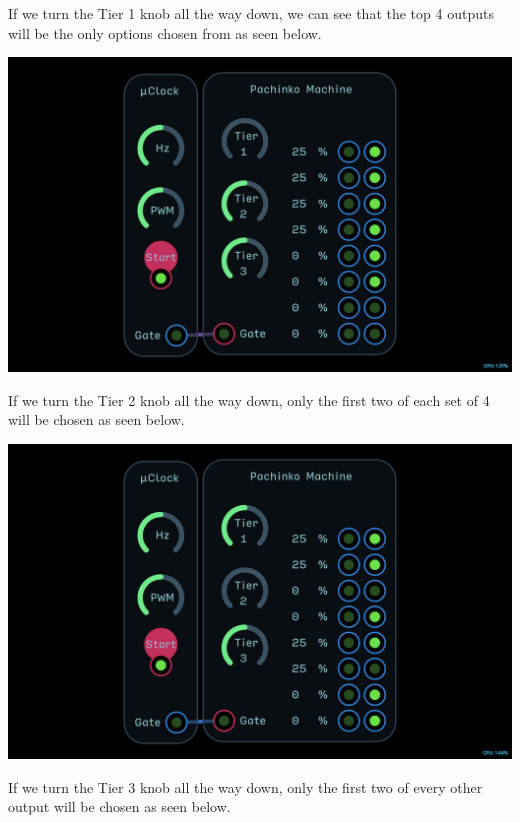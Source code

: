 \documentclass[11pt]{book}
\begin{document}
\begin{multicols*}{2}
If we turn the Tier 1 knob all the way down, we can see that the top 4 outputs will be the only options chosen from as seen below.

\begin{center}
\includegraphics[width=0.95\linewidth]{pachinko-machine-fig3.png}
\end{center}

If we turn the Tier 2 knob all the way down, only the first two of each set of 4 will be chosen as seen below.

\begin{center}
\includegraphics[width=0.95\linewidth]{pachinko-machine-fig4.png}
\end{center}

If we turn the Tier 3 knob all the way down, only the first two of every other output will be chosen as seen below.


\end{multicols*}
\end{document}
